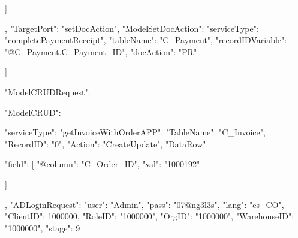 {{{{{{                     ]
                      }

                    }

                    },
                    {
                    "TargetPort": "setDocAction",                      
                    "ModelSetDocAction": {
                        "serviceType": "completePaymentReceipt",
                        "tableName": "C_Payment",
                        "recordIDVariable": "@C_Payment.C_Payment_ID",
                        "docAction": "PR"
                    }
                    }


                  ]
              }

          
    }
}






{
    "ModelCRUDRequest": {
        "ModelCRUD": {
            "serviceType": "getInvoiceWithOrderAPP",
            "TableName": "C_Invoice",
            "RecordID": "0",
            "Action": "CreateUpdate",
            "DataRow": {
                "field": [
                    {
                        "@column": "C_Order_ID",
                        "val": "1000192"
                    }
                
                ]
            }
        },
        "ADLoginRequest": {
            "user": "Admin",
            "pass": "07@ng3l3s",
            "lang": "es_CO",
            "ClientID": 1000000,
            "RoleID": "1000000",
            "OrgID": "1000000",
            "WarehouseID": "1000000",
            "stage": 9
        }
    }
}






